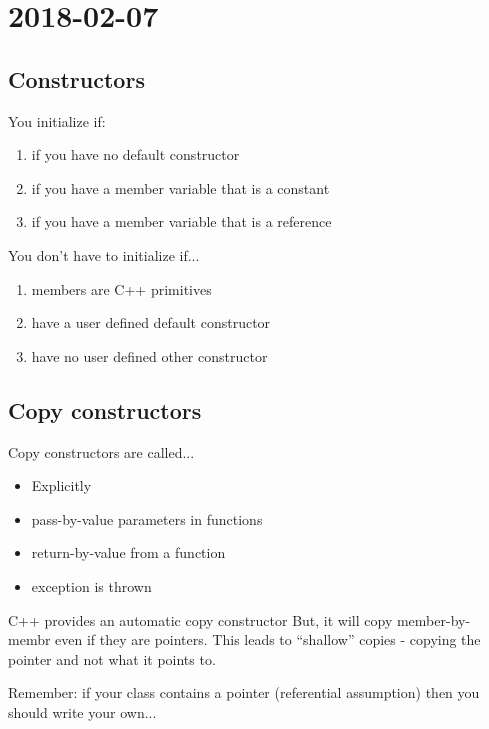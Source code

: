 \section{2018-02-07}

\subsection{Constructors}

You initialize if:

\begin{enumerate}
  \item if you have no default constructor
  \item if you have a member variable that is a constant
  \item if you have a member variable that is a reference
\end{enumerate}

You don't have to initialize if...

\begin{enumerate}
  \item members are C++ primitives
  \item have a user defined default constructor
  \item have no user defined other constructor 
\end{enumerate}

\subsection{Copy constructors}


Copy constructors are called...

\begin{itemize}
  \item Explicitly
  \item pass-by-value parameters in functions
  \item return-by-value from a function
  \item exception is thrown
\end{itemize}

C++ provides an automatic copy constructor But, it will copy member-by-membr even if they are pointers. This leads to ``shallow'' copies - copying the pointer and not what it points to.

Remember: if your class contains a pointer (referential assumption) then you should write your own...

